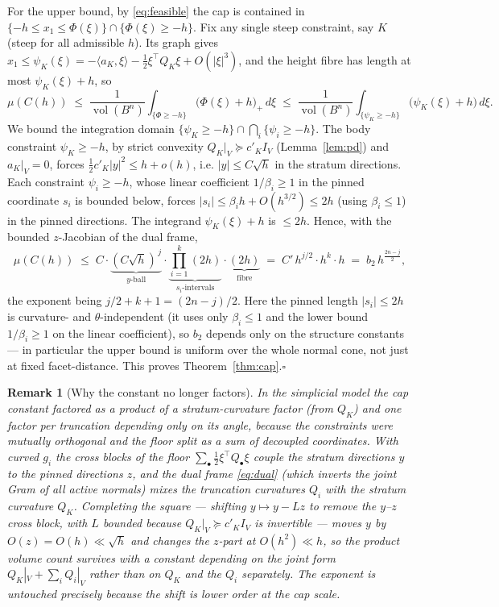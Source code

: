 \documentclass[11pt]{article}
\newtheorem{remark}[theorem]{Remark}
\newcommand{\vol}{\operatorname{vol}}
\begin{document}
For the upper bound, by \eqref{eq:feasible} the cap is contained in
$\{-h\le x_1\le\Phi(\xi)\}\cap\{\Phi(\xi)\ge-h\}$.  Fix any single steep
constraint, say $K$ (steep for all admissible $h$).  Its graph gives
$x_1\le\psi_K(\xi)=-\langle a_K,\xi\rangle-\frac12\xi^\top Q_K\xi+O(|\xi|^3)$,
and the height fibre has length at most $\psi_K(\xi)+h$, so
\[
\mu(C(h))\;\le\;\frac1{\vol(B^n)}\int_{\{\Phi\ge-h\}}\bigl(\Phi(\xi)+h\bigr)_+\,d\xi
\;\le\;\frac1{\vol(B^n)}\int_{\{\psi_K\ge-h\}}\bigl(\psi_K(\xi)+h\bigr)\,d\xi .
\]
We bound the integration domain $\{\psi_K\ge-h\}\cap\bigcap_i\{\psi_i\ge-h\}$.
The body constraint $\psi_K\ge-h$, by strict convexity $Q_K|_V\succeq c'_K I_V$
(Lemma~\ref{lem:pd}) and $a_K|_V=0$, forces $\frac12 c'_K|y|^2\le h+o(h)$, i.e.
$|y|\le C\sqrt{h}$ in the stratum directions.  Each constraint $\psi_i\ge-h$,
whose linear coefficient $1/\beta_i\ge1$ in the pinned coordinate $s_i$ is
bounded below, forces $|s_i|\le\beta_i h+O(h^{3/2})\le 2h$ (using $\beta_i\le1$)
in the pinned directions.  The integrand $\psi_K(\xi)+h$ is $\le 2h$.  Hence,
with the bounded $z$-Jacobian of the dual frame,
\[
\mu(C(h))\;\le\;C\cdot\underbrace{(C\sqrt h)^{\,j}}_{y\text{-ball}}\cdot
\underbrace{\prod_{i=1}^k(2h)}_{s_i\text{-intervals}}\cdot\underbrace{(2h)}_{\text{fibre}}
\;=\;C'\,h^{j/2}\cdot h^{k}\cdot h\;=\;b_2\,h^{\frac{2n-j}2},
\]
the exponent being $j/2+k+1=(2n-j)/2$.  Here the pinned length $|s_i|\le2h$ is
curvature- and $\theta$-independent (it uses only $\beta_i\le1$ and the lower
bound $1/\beta_i\ge1$ on the linear coefficient), so $b_2$ depends only on the
structure constants --- in particular the upper bound is uniform over the whole
normal cone, not just at fixed facet-distance.  This proves
Theorem~\ref{thm:cap}.\qquad$\square$

\begin{remark}[Why the constant no longer factors]\label{rem:factor}
In the simplicial model the cap constant factored as a product of a
stratum-curvature factor (from $Q_K$) and one factor per truncation depending
only on its angle, because the constraints were mutually orthogonal and the
floor split as a sum of decoupled coordinates.  With curved $g_i$ the cross
blocks of the floor $\sum_\bullet\frac12\xi^\top Q_\bullet\xi$ couple the
stratum directions $y$ to the pinned directions $z$, and the dual frame
\eqref{eq:dual} (which inverts the joint Gram of all active normals) mixes the
truncation curvatures $Q_i$ with the stratum curvature $Q_K$.  Completing the
square --- shifting $y\mapsto y-Lz$ to remove the $y$--$z$ cross block, with
$L$ bounded because $Q_K|_V\succeq c'_K I_V$ is invertible --- moves $y$ by
$O(z)=O(h)\ll\sqrt h$ and changes the $z$-part at $O(h^2)\ll h$, so the product
volume count survives with a constant depending on the joint form
$Q_K|_V+\sum_iQ_i|_V$ rather than on $Q_K$ and the $Q_i$ separately.  The
exponent is untouched precisely because the shift is lower order at the cap
scale.
\end{remark}
\end{document}
